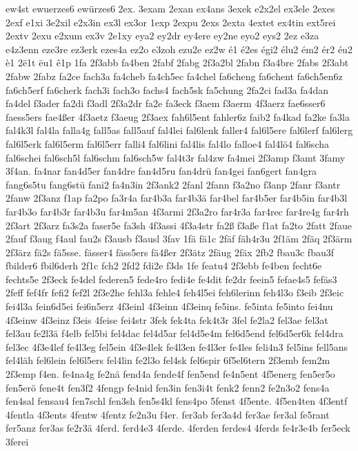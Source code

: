 {ew4st
ewuerzes6
ewürzes6
2ex.
3exam
2exan
ex4ans
3exek
e2x2el
ex3ele
2exes
2exf
e1xi
3e2xil
e2x3in
ex3l
ex3or
1exp
2expu
2exs
2exta
4extet
ex4tin
ext5rei
2extv
2exu
e2xum
ex3v
2e1xy
eya2
ey2dr
ey4ere
ey2ne
eyo2
eys2
2ez
e3za
e4z3enn
eze3re
ez3erk
ezes4a
ez2o
e3zoh
ezu2e
ez2w
é1
é2es
égi2
élu2
ém2
ér2
éu2
è1
2ë1t
ëu1
ê1p
1fa
2f3abb
fa4ben
2fabf
2fabg
2f3a2bl
2fabn
f3a4bre
2fabs
2f3abt
2fabw
2fabz
fa2ce
fach3a
fa4cheb
fa4ch5ec
fa4chel
fa6cheng
fa6chent
fa6ch5en6z
fa6ch5erf
fa6cherk
fach3i
fach3o
fachs4
fach5sk
fa5chung
2fa2ci
fad3a
fa4dan
fa4del
f3ader
fa2di
f3adl
2f3a2dr
fa2e
fa3eck
f3aem
f3aerm
4f3aerz
fae6sser6
faess5ers
fae4ßer
4f3aetz
f3aeug
2f3aex
fah6l5ent
fahler6z
faib2
fa4kad
fa2ke
fa3la
fal4k3l
fal4la
falla4g
fall5as
fall5auf
fal4lei
fal6lenk
faller4
fal6l5ere
fal6lerf
fal6lerg
fal6l5erk
fal6l5erm
fal6l5err
falli4
fal6lini
fal4lis
fal4lo
falloe4
fal4lö4
fal6scha
fal6schei
fal6sch5l
fal6schm
fal6sch5w
fal4t3r
fal4zw
fa4mei
2f3amp
f3amt
3famy
3f4an.
fa4nar
fan4d5er
fan4dre
fan4d5ru
fan4drü
fan4gei
fan6gert
fan4gra
fang6s5tu
fang6stü
fani2
fa4n3in
2f3ank2
2fanl
2fann
f3a2no
f3anp
2fanr
f3antr
2fanw
2f3anz
f1ap
fa2po
fa3r4a
far4b3a
far4b3ä
far4bel
far4b5er
far4b5in
far4b3l
far4b3o
far4b3r
far4b3u
far4m5an
4f3armi
2f3a2ro
far4r3a
far4rec
far4re4g
far4rh
2f3art
2f3arz
fa3s2a
faser5e
fa3sh
4f3assi
4f3a4str
fa2ß
f3aße
f1at
fa2to
2fatt
2faue
2fauf
f3aug
f4aul
fau2s
f3ausb
f3ausl
3fav
1fä
fä1c
2fäf
fäh4r3u
2f1äm
2fäq
2f3ärm
2f3ärz
fä2s
fä5sse.
fässer4
fäss5ers
fä4ßer
2f3ätz
2fäug
2fäx
2fb2
fbau3c
fbau3f
fbilder6
fbil6derh
2f1c
fch2
2fd2
fdi2e
f3ds
1fe
featu4
2f3ebb
fe4ben
fecht6e
fechts5e
2f3eck
fe4del
federen5
fede4ro
fedi4e
fe4dit
fe2dr
feein5
fefae4s5
fefäs3
2feff
fef4fr
fefi2
fef2l
2f3e2he
fehl3a
fehle4
feh4l5ei
feh6lerinn
feh4l3o
f3eib
2f3eic
fei4l3a
fein6d5ei
fei6n5erz
4f3einl
4f3einn
4f3einq
fe5ins.
fe5inta
fe5into
fei4nu
4f3einw
4f3einz
f3eis
4feise
fei4str
3fek
fek4ta
fek4t3r
3fel
fe2la2
fel3ae
fel3at
fel3au
fe2l3ä
f4elb
fel5bi
fel4dac
fel4d5ar
fel4d5e4m
fel6d5end
fel6d5er6k
fel4dra
fel3ec
4f3e4lef
fe4l3eg
fel5ein
4f3e4lek
fe4l3en
fe4l3er
fe4les
feli4n3
fel5ins
fell5ans
fel4läh
fel6lein
fel6l5ers
fel4lin
fe2l3o
fel4sk
fel6spir
6f5el6tern
2f3emb
fem2m
2f3emp
f4en.
fe4na4g
fe2nä
fend4a
fende4f
fen5end
fe4n5ent
4f5energ
fen5er5o
fen5erö
fene4t
fen3f2
4fengp
fe4nid
fen3in
fen3i4t
fenk2
fenn2
fe2n3o2
fens4a
fen4sal
fensau4
fen7schl
fen3sh
fen5s4kl
fens4po
5fenst
4f5ente.
4f5en4ten
4f3entf
4fentla
4f3ents
4fentw
4fentz
fe2n3u
f4er.
fer3ab
fer3a4d
fer3ae
fer3al
fe5rant
fer5anz
fer3as
fe2r3ä
4ferd.
ferd4e3
4ferde.
4ferden
ferdes4
4ferds
fe4r3e4b
fer5eck
3ferei
}
